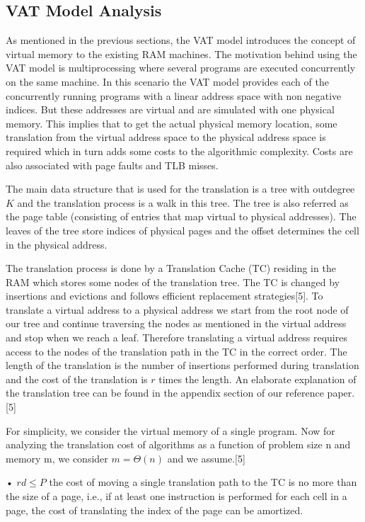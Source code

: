 \subsection{VAT Model Analysis}
As mentioned in the previous sections, the VAT model introduces the concept of
virtual memory to the existing RAM machines. The motivation behind using the
VAT model is multiprocessing where several programs are executed concurrently
on the same machine. In this scenario the VAT model provides each of the
concurrently running programs with a linear address space with non negative
indices. But these addresses are virtual and are simulated with one physical
memory. This implies that to get the actual physical memory location, some
translation from the virtual address space to the physical address space is
required which in turn adds some costs to the algorithmic complexity. Costs are
also associated with page faults and TLB misses.

The main data structure that is used for the translation is a tree with
outdegree $K$ and the translation process is a walk in this tree. The tree is
also referred as the page table (consisting of entries that map virtual to
physical addresses). The leaves of the tree store indices of physical pages and
the offset determines the cell in the physical address.

The translation process is done by a Translation Cache (TC) residing in the RAM
which stores some nodes of the translation tree. The TC is changed by
insertions and evictions and follows efficient replacement strategies[5]. To
translate a virtual address to a physical address we start from the root node
of our tree and continue traversing the nodes as mentioned in the virtual
address and stop when we reach a leaf. Therefore translating a virtual address
requires access to the nodes of the translation path in the TC in the correct
order. The length of the translation is the number of insertions performed
during translation and the cost of the translation is $r$ times the length. An
elaborate explanation of the translation tree can be found in the appendix
section of our reference paper.[5]

For simplicity, we consider the virtual memory of a single program. Now for
analyzing the translation cost of algorithms as a function of problem size n
and memory m, we consider $m = \Theta(n)$ and we assume.[5]

• $rd \leq P$ the cost of moving a single translation path to the TC is no more
than the size of a page, i.e., if at least one instruction is performed for
each cell in a page, the cost of translating the index of the page can be
amortized.

